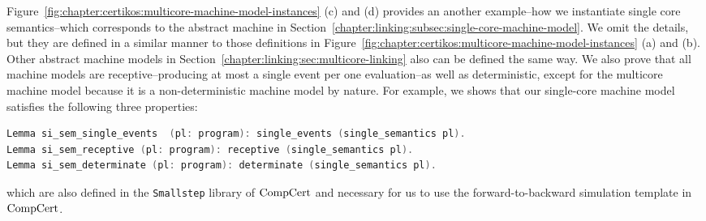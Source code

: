 Figure~\ref{fig:chapter:certikos:multicore-machine-model-instances} (c) and (d) provides an another example--how 
we instantiate single core semantics--which corresponds to the abstract machine in Section~\ref{chapter:linking:subsec:single-core-machine-model}.
We omit the details, but they are defined in a similar manner to those definitions in Figure~\ref{fig:chapter:certikos:multicore-machine-model-instances} (a) and (b). 
Other abstract machine models 
in Section~\ref{chapter:linking:sec:multicore-linking} also can be defined 
 the same way. 
We also prove that all machine models 
are receptive--producing at most a single event per one evaluation--as well as deterministic, 
except for the multicore machine model because it is a non-deterministic machine model by nature.
For example, 
we shows that
our single-core machine model satisfies the following three properties:
\begin{lstlisting}[language=C]
Lemma si_sem_single_events  (pl: program): single_events (single_semantics pl).
Lemma si_sem_receptive (pl: program): receptive (single_semantics pl).
Lemma si_sem_determinate (pl: program): determinate (single_semantics pl).
\end{lstlisting}
which are also defined in  the \lstinline$Smallstep$ library of $\mathrm{CompCert}$ and
necessary for us to use 
the forward-to-backward simulation template in $\mathrm{CompCert}$. 

%
%
%

%    
%    

